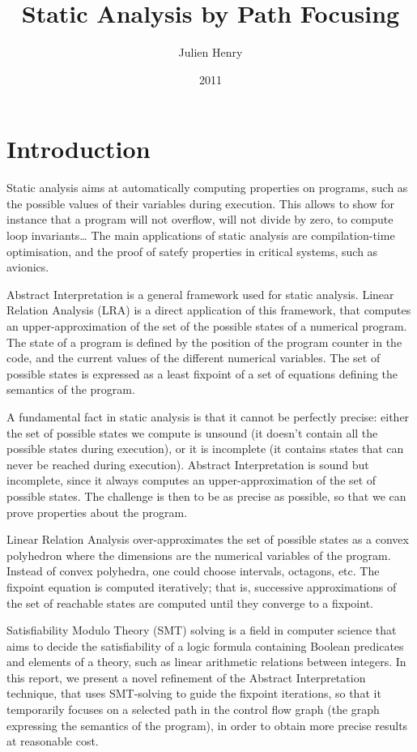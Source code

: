 \documentclass[a4paper,english,titlepage,11pt]{report}
\title{Static Analysis by Path Focusing}
\author{Julien Henry}
\date{2011}
\institute{Grenoble-INP}
\begin{document}
  
  \maketitlepage

  \tableofcontents
  
  \newpage


\chapter{Introduction} 

Static analysis aims at automatically computing properties on programs, such as
the possible values of their variables during execution. This allows to show for
instance that a program will not overflow, will not divide by zero, to compute
loop invariants\dots
The main applications of static analysis are compilation-time optimisation, and
the proof of satefy properties in critical systems, such as avionics.

Abstract Interpretation is a general framework used for static analysis.
Linear Relation Analysis (LRA) is a direct application of this framework, that
computes an upper-approximation of the set of the possible states of a numerical
program. The state of a program is defined by the position of the program
counter in the code, and the current values of the different numerical variables.
The set of possible states is expressed as a least fixpoint of a set of
equations defining the semantics of the program. 

A fundamental fact in static analysis is that it cannot be perfectly precise:
either the set of possible states we compute is unsound (it doesn't contain all
the possible states during execution), or it is incomplete (it contains
states that can never be reached during execution). 
Abstract Interpretation is sound but incomplete, since it always computes an
upper-approximation of the set of possible states. The challenge is then to be
as precise as possible, so that we can prove properties about the program.

Linear Relation Analysis over-approximates the set of possible states as a
convex polyhedron where the dimensions are the numerical variables of the
program.
Instead of convex polyhedra, one could choose intervals, octagons, etc.
The fixpoint equation is computed iteratively; that is, successive
approximations of the set of reachable states are computed until they converge
to a fixpoint. 

Satisfiability Modulo Theory (SMT) solving is a field in computer science that
aims to decide the satisfiability of a logic formula containing Boolean
predicates and elements of a theory, such as linear arithmetic relations between
integers.
In this report, we present a novel refinement of the Abstract Interpretation
technique, that uses SMT-solving to guide the fixpoint iterations, so that it
temporarily focuses on a selected path in the control flow graph (the graph
expressing the semantics of the program), in order to
obtain more precise results at reasonable cost.
\end{document}
